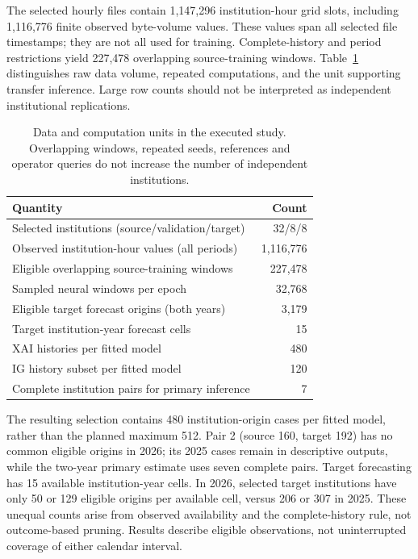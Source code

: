 \documentclass[conference]{IEEEtran}
\begin{document}
The selected hourly files contain 1,147,296 institution-hour grid slots, including 1,116,776 finite observed byte-volume values. These values span all selected file timestamps; they are not all used for training. Complete-history and period restrictions yield 227,478 overlapping source-training windows. Table~\ref{tab:units} distinguishes raw data volume, repeated computations, and the unit supporting transfer inference. Large row counts should not be interpreted as independent institutional replications.

\begin{table}[t]\centering
\caption{Data and computation units in the executed study. Overlapping windows, repeated seeds, references and operator queries do not increase the number of independent institutions.}\label{tab:units}
\begin{tabular}{lr}\toprule
Quantity & Count\\\midrule
Selected institutions (source/validation/target)&32/8/8\\
Observed institution-hour values (all periods)&1,116,776\\
Eligible overlapping source-training windows&227,478\\
Sampled neural windows per epoch&32,768\\
Eligible target forecast origins (both years)&3,179\\
Target institution-year forecast cells&15\\
XAI histories per fitted model&480\\
IG history subset per fitted model&120\\
Complete institution pairs for primary inference&7\\\bottomrule
\end{tabular}\end{table}

The resulting selection contains 480 institution-origin cases per fitted model, rather than the planned maximum 512. Pair 2 (source 160, target 192) has no common eligible origins in 2026; its 2025 cases remain in descriptive outputs, while the two-year primary estimate uses seven complete pairs. Target forecasting has 15 available institution-year cells. In 2026, selected target institutions have only 50 or 129 eligible origins per available cell, versus 206 or 307 in 2025. These unequal counts arise from observed availability and the complete-history rule, not outcome-based pruning. Results describe eligible observations, not uninterrupted coverage of either calendar interval.
\end{document}
